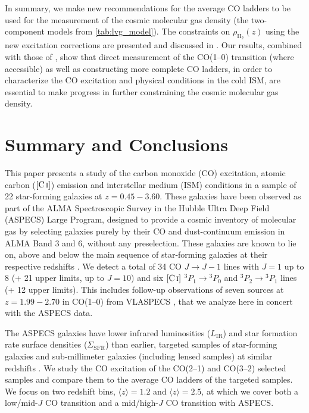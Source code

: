 \documentclass[twocolumn]{aastex62}
\newcommand{\LIR}{\ensuremath{L_{\mathrm{IR}}}}
\newcommand{\SigmaSFR}{\ensuremath{\Sigma_{\mathrm{SFR}}}}
\newcommand{\HH}{\ensuremath{\mathrm{H}_{2}}}
\newcommand{\rhoHH}{\ensuremath{\rho_{\HH}}}
\newcommand{\avg}[1]{\ensuremath{\langle #1 \rangle}}
\newcommand{\CI}{\ensuremath{\mathrm{[C\, \textsc{i}]}}}
\begin{document}
In summary, we make new recommendations for the average CO ladders to be used
for the measurement of the cosmic molecular gas density (the two-component
models from \autoref{tab:lvg_model}).  The constraints on $\rhoHH(z)$ using the
new excitation corrections are presented and discussed in \cite{Decarli2020}.
Our results, combined with those of \cite{Riechers2020b}, show that direct
measurement of the CO(1--0) transition (where accessible) as well as
constructing more complete CO ladders, in order to characterize the CO
excitation and physical conditions in the cold ISM, are essential to make
progress in further constraining the cosmic molecular gas density.
\newpage
\section{Summary and Conclusions}
\label{sec:conclusions}
This paper presents a study of the carbon monoxide (CO) excitation, atomic
carbon (\CI) emission and interstellar medium (ISM) conditions in a sample of
22 star-forming galaxies at $z=0.45 - 3.60$.  These galaxies have been observed
as part of the ALMA Spectroscopic Survey in the Hubble Ultra Deep Field
(ASPECS) Large Program, designed to provide a cosmic inventory of molecular gas
by selecting galaxies purely by their CO and dust-continuum emission in ALMA
Band 3 and 6, without any preselection.  These galaxies are known to lie on,
above and below the main sequence of star-forming galaxies at their respective
redshifts \citep{Boogaard2019, Aravena2019, Aravena2020}.  We detect a total of
34 CO $J\rightarrow J-1$ lines with $J=1$ up to 8 (+ 21 upper limits, up to
$J=10$) and six $\CI$ ${^{3}P_{1}} \rightarrow {^{3}P_{0}}$ and
${^{3}P_{2}} \rightarrow {^{3}P_{1}}$ lines (+ 12 upper limits).  This includes
follow-up observations of seven sources at $z=1.99-2.70$ in CO(1--0) from
VLASPECS \citep{Riechers2020b}, that we analyze here in concert with the ASPECS
data.

The ASPECS galaxies have lower infrared luminosities (\LIR) and star formation
rate surface densities (\SigmaSFR) than earlier, targeted samples of
star-forming galaxies and sub-millimeter galaxies (including lensed samples) at
similar redshifts \citep{Daddi2015, Bothwell2013, Spilker2014}.  We study the
CO excitation of the CO(2--1) and CO(3--2) selected samples and compare them to
the average CO ladders of the targeted samples.  We focus on two redshift bins,
$\avg{z}=1.2$ and $\avg{z}=2.5$, at which we cover both a low/mid-$J$ CO
transition and a mid/high-$J$ CO transition with ASPECS.
\end{document}
